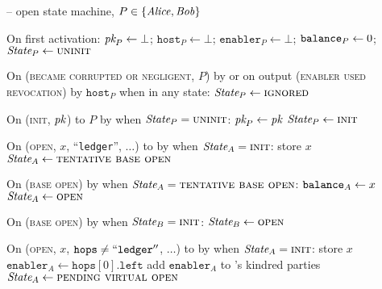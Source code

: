 \begin{center}
  \begin{systembox}{\fchan{} -- open state machine, $P \in \{\mathit{Alice}, \mathit{Bob}\}$}
    \begin{algorithmic}[1]
      \State On first activation: 
      \label{code:functionality:open:boot}
      \Indent
        \State $\textit{pk}_{P} \gets \bot$; $\texttt{host}_P \gets \bot$;
        $\texttt{enabler}_P \gets \bot$; $\texttt{balance}_{P} \gets 0$;
        \State $\itistate_P \gets \textsc{uninit}$
      \EndIndent
      \Statex

      \State On (\textsc{became corrupted or negligent}, $P$) by \adversary or
      on output (\textsc{enabler used revocation}) by $\texttt{host}_P$ when in
      any state:
      \label{code:functionality:open:when-ignored}
      \Indent
        \State $\itistate_P \gets \textsc{ignored}$
      \EndIndent
      \Statex

      \State On (\textsc{init}, $\textit{pk}_{}$) to $P$ by \environment when
      $\itistate_P = \textsc{uninit}$:
      \Indent
        \State $\textit{pk}_{P} \gets \textit{pk}_{}$
        \State $\itistate_P \gets \textsc{init}$
      \EndIndent
      \Statex

      \State On (\textsc{open}, $x$, ``\texttt{ledger}'', $\dots$) to \alice by
      \environment when $\itistate_A = \textsc{init}$:
      \Indent
        \State store $x$
        \label{code:functionality:open:store}
        \State $\itistate_A \gets \textsc{tentative base open}$
      \EndIndent
      \Statex

      \State On (\textsc{base open}) by \adversary when $\itistate_A =
      \textsc{tentative base open}$:
      \Indent
        \State $\texttt{balance}_{A} \gets x$
        \label{code:functionality:open:base-balance}
        \State $\itistate_A \gets \textsc{open}$
      \EndIndent
      \Statex

      \State On (\textsc{base open}) by \adversary when $\itistate_B =
      \textsc{init}$:
      \label{code:functionality:open:when-open-bob}
      \Indent
        \State $\itistate_B \gets \textsc{open}$
      \EndIndent
      \Statex

      \State On (\textsc{open}, $x$, $\texttt{hops} \neq ``\texttt{ledger}''$,
      $\dots$) to \alice by \environment when $\itistate_A = \textsc{init}$:
      \Indent
        \State store $x$
        \State $\texttt{enabler}_A \gets \texttt{hops}[0].\texttt{left}$
        \State add $\texttt{enabler}_A$ to \alice's kindred parties
        \State $\itistate_A \gets \textsc{pending virtual open}$
      \EndIndent
      \Statex


\end{algorithmic}
\end{systembox}
\end{center}
